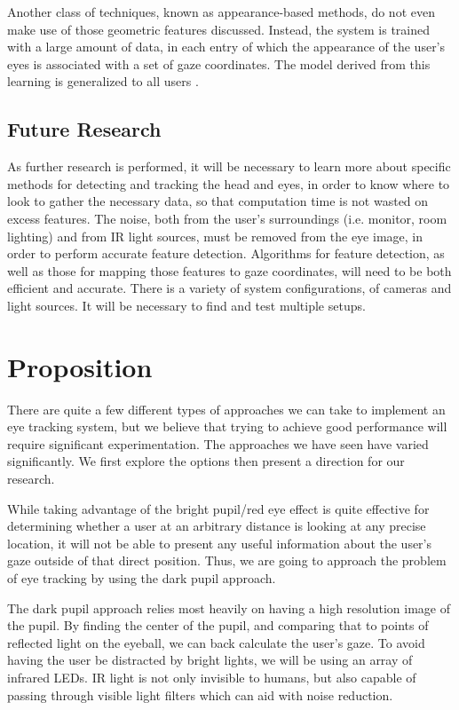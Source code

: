 \documentclass[12pt,conference,onecolumn]{IEEEtran}
\begin{document}
Another class of techniques, known as appearance-based methods, do not even make use of those geometric features discussed. Instead, the system is trained with a large amount of data, in each entry of which the appearance of the user's eyes is associated with a set of gaze coordinates. The model derived from this learning is generalized to all users \cite{morimoto}.
\subsection{Future Research}

As further research is performed, it will be necessary to learn more about specific methods for detecting and tracking the head and eyes, in order to know where to look to gather the necessary data, so that computation time is not wasted on excess features. The noise, both from the user's surroundings (i.e. monitor, room lighting) and from IR light sources, must be removed from the eye image, in order to perform accurate feature detection. Algorithms for feature detection, as well as those for mapping those features to gaze coordinates, will need to be both efficient and accurate. There is a variety of system configurations, of cameras and light sources. It will be necessary to find and test multiple setups. 
\section{Proposition} \label{sec:proposition}
There are quite a few different types of approaches we can take to implement an eye tracking system, but we believe that trying to achieve good performance will require significant experimentation. The approaches we have seen have varied significantly.  We first explore the options then present a direction for our research.

	While taking advantage of the bright pupil/red eye effect is quite effective for determining whether a user at an arbitrary distance is looking at any precise location, it will not be able to present any useful information  about the user’s gaze outside of that direct position.  Thus, we are going to approach the problem of eye tracking by using the dark pupil approach.
	
	The dark pupil approach relies most heavily on having a high resolution image of the pupil. By finding the center of the pupil, and comparing that to points of reflected light on the eyeball, we can back calculate the user’s gaze. To avoid having the user be distracted by bright lights, we will be using an array of infrared LEDs. IR light is not only invisible to humans, but also capable of passing through visible light filters which can aid with noise reduction. 
	
\end{document}
